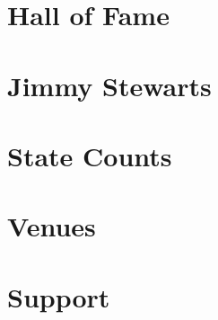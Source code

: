\documentclass[8pt]{book}
\begin{document}
\chapter{Hall of Fame}

\begin{multicols*}{3}
\setlength{\columnseprule}{0.4pt}
\noindent

\end{multicols*}


\chapter{Jimmy Stewarts}

\begin{multicols*}{3}
\setlength{\columnseprule}{0.4pt}
\noindent

\end{multicols*}


\chapter{State Counts}

\begin{multicols*}{2}
\setlength{\columnseprule}{0.4pt}
\noindent

\end{multicols*}

\chapter{Venues}

\begin{multicols*}{3}
\setlength{\columnseprule}{0.4pt}

\end{multicols*}

\chapter{Support}

\begin{multicols*}{3}
\setlength{\columnseprule}{0.4pt}

\end{multicols*}
\end{document}

